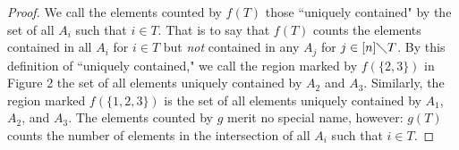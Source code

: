 \documentclass{article} %
\theoremstyle{definition}
\theoremstyle{plain}
\begin{document}
\begin{proof}
We call the elements counted by $f(T)$ those ``uniquely contained" by the set of all $A_i$ such that $i\in T$. That is to say that $f(T)$ counts the elements contained in all $A_i$ for $i\in T$ but \textit{not} contained in any $A_j$ for $j\in [n]\diagdown T$. By this definition of ``uniquely contained," we call the region marked by $f(\{2,3\})$ in Figure 2 the set of all elements uniquely contained by $A_2$ and $A_3$. Similarly, the region marked $f(\{1,2,3\})$ is the set of all elements uniquely contained by $A_1$, $A_2$, and $A_3$. 
The elements counted by $g$ merit no special name, however: $g(T)$ counts the number of elements in the intersection of all $A_i$ such that $i\in T$.


\end{proof}
\end{document}
